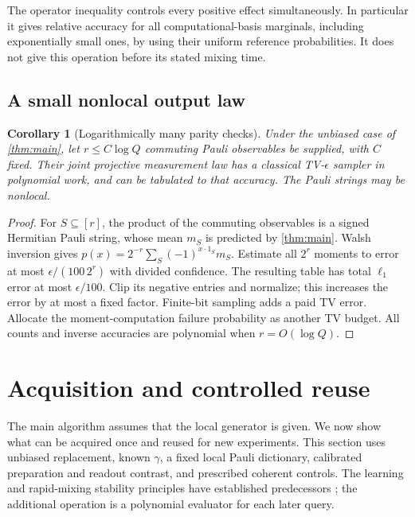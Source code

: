 \documentclass[11pt,reqno]{amsart}
\numberwithin{equation}{section}
\newtheorem{corollary}[theorem]{Corollary}
\theoremstyle{definition}
\theoremstyle{remark}
\begin{document}
The operator inequality controls every positive effect simultaneously. In particular it gives relative accuracy for all computational-basis marginals, including exponentially small ones, by using their uniform reference probabilities. It does not give this operation before its stated mixing time.

\subsection{A small nonlocal output law}
\begin{corollary}[Logarithmically many parity checks]\label{cor:syndrome}
Under the unbiased case of \cref{thm:main}, let $r\leq C\log Q$ commuting Pauli observables be supplied, with $C$ fixed. Their joint projective measurement law has a classical TV-$\epsilon$ sampler in polynomial work, and can be tabulated to that accuracy. The Pauli strings may be nonlocal.
\end{corollary}
\begin{proof}
For $S\subseteq[r]$, the product of the commuting observables is a signed Hermitian Pauli string, whose mean $m_S$ is predicted by \cref{thm:main}. Walsh inversion gives
$p(x)=2^{-r}\sum_S(-1)^{x\cdot1_S}m_S$.
Estimate all $2^r$ moments to error at most $\epsilon/(100\,2^r)$ with divided confidence. The resulting table has total $\ell_1$ error at most $\epsilon/100$. Clip its negative entries and normalize; this increases the error by at most a fixed factor. Finite-bit sampling adds a paid TV error. Allocate the moment-computation failure probability as another TV budget. All counts and inverse accuracies are polynomial when $r=O(\log Q)$.
\end{proof}


\section{Acquisition and controlled reuse}\label{sec:acquisition}

The main algorithm assumes that the local generator is given. We now show what can be acquired once and reused for new experiments. This section uses unbiased replacement, known $\gamma$, a fixed local Pauli dictionary, calibrated preparation and readout contrast, and prescribed coherent controls. The learning and rapid-mixing stability principles have established predecessors \cite{MBFR,LCMP}; the additional operation is a polynomial evaluator for each later query.
\end{document}
